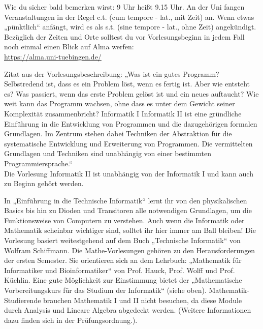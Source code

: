 
Wie du sicher bald bemerken wirst: 9 Uhr heißt 9.15 Uhr. An der Uni fangen Veranstaltungen in der Regel c.t. (cum
tempore - lat., mit Zeit) an. Wenn etwas „pünktlich“ anfängt, wird es als s.t. (sine tempore - lat., ohne
Zeit) angekündigt.
Bezüglich der Zeiten und Orte solltest du vor Vorlesungsbeginn in jedem Fall noch einmal einen Blick auf Alma werfen:\\
\url{https://alma.uni-tuebingen.de/}

\ifbachelor
\pagebreak
{}
Zitat aus der Vorlesungsbeschreibung: „Was ist ein gutes Programm? Selbstredend ist, dass es ein
Problem löst, wenn es fertig ist. Aber wie entsteht es? Was passiert, wenn das erste Problem gelöst
ist und ein neues auftaucht? Wie weit kann das Programm wachsen, ohne dass es unter dem Gewicht
seiner Komplexität zusammenbricht? 
\ifwintersemester
Informatik I 
\fi
\ifsommersemester
Informatik II
\fi 
ist eine gründliche Einführung in die Entwicklung
von Programmen und die dazugehörigen formalen Grundlagen. Im Zentrum stehen dabei Techniken der Abstraktion
für die systematische Entwicklung und Erweiterung von Programmen. Die vermittelten Grundlagen und Techniken
sind unabhängig von einer bestimmten Programmiersprache.“\\
\ifsommersemester
Die Vorlesung Informatik II ist unabhängig von der Informatik I und kann auch zu Beginn gehört werden.
\fi

\ifinfo
\ifwintersemester
{}
In „Einführung in die Technische Informatik“ lernt ihr von den physikalischen Basics bis hin zu Dioden und Transitoren alle notwendigen Grundlagen, um die Funktionsweise von Computern zu verstehen. Auch wenn die Informatik oder Mathematik scheinbar wichtiger sind, solltet ihr hier immer am Ball bleiben! Die Vorlesung basiert weitestgehend auf dem Buch „Technische Informatik“ von Wolfram Schiffmann.
\fi
\fi
{}
Die Mathe-Vorlesungen gehören zu den Herausforderungen der ersten Semester. Sie orientieren
sich an dem Lehrbuch: „Mathematik für Informatiker und Bioinformatiker“ von Prof.
Hauck, Prof. Wolff und Prof. Küchlin. Eine gute Möglichkeit zur Einstimmung bietet der „Mathematische
Vorbereitungskurs für das Studium der Informatik“ (siehe oben).
\iflehramt
Mathematik-Studierende brauchen Mathematik I
und II nicht besuchen, da diese Module durch Analysis und Lineare Algebra
abgedeckt werden. (Weitere Informationen dazu finden sich in der Prüfungsordnung.).
\fi
\fi
